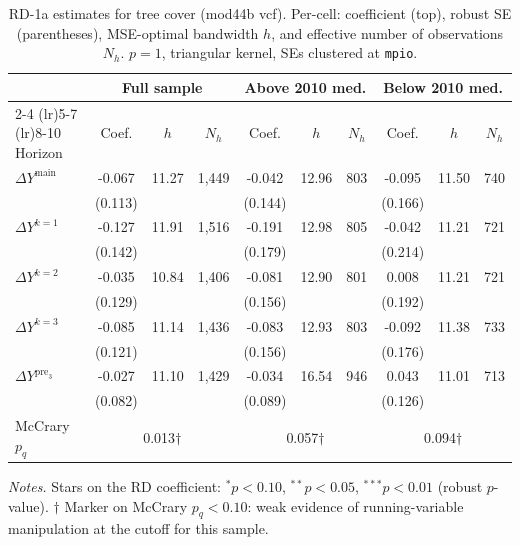 \documentclass[11pt]{article}
\begin{document}
\begin{table}[H]
\centering
\scriptsize
\caption{RD-1a estimates for tree cover (mod44b vcf). Per-cell: coefficient
(top), robust SE (parentheses), MSE-optimal bandwidth $h$, and
effective number of observations $N_h$. $p=1$, triangular kernel,
SEs clustered at \texttt{mpio}.}
\label{tab:rdplot_rd1a_tree_cover}
\begin{tabular}{l ccc ccc ccc}
\toprule
 & \multicolumn{3}{c}{Full sample} & \multicolumn{3}{c}{Above 2010 med.} & \multicolumn{3}{c}{Below 2010 med.} \\
\cmidrule(lr){2-4} \cmidrule(lr){5-7} \cmidrule(lr){8-10}
Horizon & Coef. & $h$ & $N_h$ & Coef. & $h$ & $N_h$ & Coef. & $h$ & $N_h$ \\
\midrule
$\Delta Y^{\text{main}}$ & -0.067 & 11.27 & 1,449 & -0.042 & 12.96 & 803 & -0.095 & 11.50 & 740 \\
 & (0.113) &  &  & (0.144) &  &  & (0.166) &  &  \\
\addlinespace[1pt]
$\Delta Y^{k=1}$ & -0.127 & 11.91 & 1,516 & -0.191 & 12.98 & 805 & -0.042 & 11.21 & 721 \\
 & (0.142) &  &  & (0.179) &  &  & (0.214) &  &  \\
\addlinespace[1pt]
$\Delta Y^{k=2}$ & -0.035 & 10.84 & 1,406 & -0.081 & 12.90 & 801 & 0.008 & 11.21 & 721 \\
 & (0.129) &  &  & (0.156) &  &  & (0.192) &  &  \\
\addlinespace[1pt]
$\Delta Y^{k=3}$ & -0.085 & 11.14 & 1,436 & -0.083 & 12.93 & 803 & -0.092 & 11.38 & 733 \\
 & (0.121) &  &  & (0.156) &  &  & (0.176) &  &  \\
\addlinespace[1pt]
$\Delta Y^{\text{pre}_3}$ & -0.027 & 11.10 & 1,429 & -0.034 & 16.54 & 946 & 0.043 & 11.01 & 713 \\
 & (0.082) &  &  & (0.089) &  &  & (0.126) &  &  \\
\addlinespace[1pt]
\midrule
McCrary $p_q$ & \multicolumn{3}{c}{0.013$\dagger$} & \multicolumn{3}{c}{0.057$\dagger$} & \multicolumn{3}{c}{0.094$\dagger$} \\
\bottomrule
\end{tabular}
\begin{flushleft}\footnotesize
\textit{Notes.} Stars on the RD coefficient: $^{*}p<0.10$,
$^{**}p<0.05$, $^{***}p<0.01$ (robust $p$-value).
$\dagger$ Marker on McCrary $p_q<0.10$: weak evidence of running-variable manipulation at the cutoff for this sample.\\
\end{flushleft}
\end{table}
\end{document}
